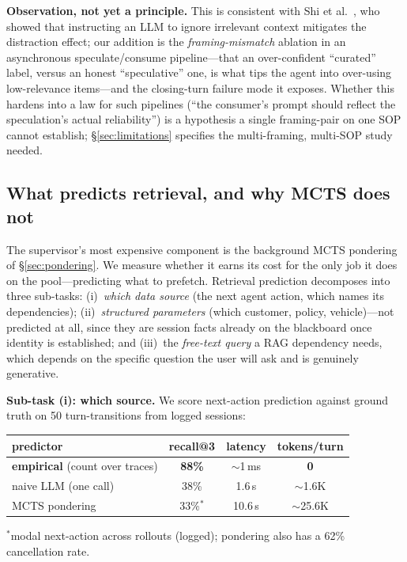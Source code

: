 \documentclass[10pt,twocolumn]{article}
\begin{document}
\textbf{Observation, not yet a principle.} This is consistent with Shi et al.~\cite{shi2023}, who showed that instructing an LLM to ignore irrelevant context mitigates the distraction effect; our addition is the \emph{framing-mismatch} ablation in an asynchronous speculate/consume pipeline---that an over-confident ``curated'' label, versus an honest ``speculative'' one, is what tips the agent into over-using low-relevance items---and the closing-turn failure mode it exposes. Whether this hardens into a law for such pipelines (``the consumer's prompt should reflect the speculation's actual reliability'') is a hypothesis a single framing-pair on one SOP cannot establish; \S\ref{sec:limitations} specifies the multi-framing, multi-SOP study needed.

\subsection{What predicts retrieval, and why MCTS does not}
\label{sec:abl-predictor}

The supervisor's most expensive component is the background MCTS pondering of \S\ref{sec:pondering}. We measure whether it earns its cost for the only job it does on the pool---predicting what to prefetch. Retrieval prediction decomposes into three sub-tasks: (i)~\emph{which data source} (the next agent action, which names its dependencies); (ii)~\emph{structured parameters} (which customer, policy, vehicle)---not predicted at all, since they are session facts already on the blackboard once identity is established; and (iii)~the \emph{free-text query} a RAG dependency needs, which depends on the specific question the user will ask and is genuinely generative.

\textbf{Sub-task (i): which source.} We score next-action prediction against ground truth on 50 turn-transitions from logged sessions:

\begin{center}\footnotesize\setlength{\tabcolsep}{4pt}
\begin{tabular}{lccc}
\toprule
predictor & recall@3 & latency & tokens/turn \\
\midrule
\textbf{empirical} (count over traces) & \textbf{88\%} & $\sim$1\,ms & \textbf{0} \\
naive LLM (one call) & 38\% & 1.6\,s & $\sim$1.6K \\
MCTS pondering & 33\%$^{*}$ & 10.6\,s & $\sim$25.6K \\
\bottomrule
\end{tabular}
\end{center}
{\footnotesize $^{*}$modal next-action across rollouts (logged); pondering also has a 62\% cancellation rate.}
\end{document}

